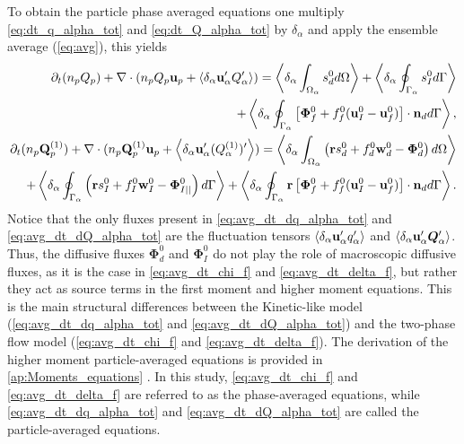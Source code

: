 To obtain the particle phase averaged equations one multiply \ref{eq:dt_q_alpha_tot} and \ref{eq:dt_Q_alpha_tot} by $\delta_\alpha$ and apply the ensemble average (\ref{eq:avg}), this yields
\begin{align}
    \partial_t (n_pQ_p)
    + \mathbf{\nabla}\cdot (n_p Q_p \textbf{u}_p + \left<\delta_\alpha \textbf{u}_\alpha' Q_\alpha'\right>)
    = \left<\delta_\alpha \int_{\Omega_{\alpha}}  s_d^0  d\Omega\right>
    + \left<\delta_\alpha \oint_{\Gamma_{\alpha}}  s_I^0  d\Gamma\right>\nonumber\\
    + \left<\delta_\alpha \oint_{\Gamma_{\alpha}}  \left[\mathbf{\Phi}_f^0 + f_f^0 (\textbf{u}_I^0-\textbf{u}_f^0) \right] \cdot \textbf{n}_d  d\Gamma\right>,
    \label{eq:avg_dt_dq_alpha_tot}\\
    \partial_t (n_p\textbf{Q}_p^{(1)})
    + \mathbf{\nabla}\cdot (n_p \textbf{Q}_p^{(1)} \textbf{u}_p + \left<\delta_\alpha \textbf{u}_\alpha' (Q_\alpha^{(1)})'\right>)
    =\left<\delta_\alpha \int_{\Omega_{\alpha}}  \left(
        \textbf{r} s_d^0         
        + f_d^0  \textbf{w}_d^0 
        - \mathbf{\Phi}_d^0
    \right)  d\Omega\right>\nonumber\\
    + \left<\delta_\alpha \oint_{\Gamma_{\alpha}}  \left(
        \textbf{r}s_I^0
        + f_I^0 \textbf{w}_I^0
        - \mathbf{\Phi}_{I||}^0
    \right)  d\Gamma\right>
    + \left<\delta_\alpha \oint_{\Gamma_{\alpha}}  \textbf{r} \left[
        \mathbf{\Phi}_f^0
        + f_f^0 (\textbf{u}_I^0-\textbf{u}_f^0)
    \right]\cdot \textbf{n}_d   d\Gamma\right>.
    \label{eq:avg_dt_dQ_alpha_tot}
\end{align}
Notice that the only fluxes present in \ref{eq:avg_dt_dq_alpha_tot} and \ref{eq:avg_dt_dQ_alpha_tot} are the fluctuation tensors $\left<\delta_\alpha \textbf{u}_\alpha' q_\alpha'\right>$ and $\left<\delta_\alpha \textbf{u}_\alpha' \bm{Q}_\alpha'\right>$. 
Thus, the diffusive fluxes $\bm\Phi_d^0$ and $\bm\Phi_I^0$ do not play the role of macroscopic diffusive fluxes, as it is the case in \ref{eq:avg_dt_chi_f} and \ref{eq:avg_dt_delta_f}, but rather they act as source terms in the first moment and higher moment equations. 
This is the main structural differences between the Kinetic-like model (\ref{eq:avg_dt_dq_alpha_tot} and \ref{eq:avg_dt_dQ_alpha_tot}) and the two-phase flow model (\ref{eq:avg_dt_chi_f} and \ref{eq:avg_dt_delta_f}). 
The derivation of the higher moment particle-averaged equations is provided in \ref{ap:Moments_equations} . 
In this study, \ref{eq:avg_dt_chi_f} and \ref{eq:avg_dt_delta_f} are referred to as the phase-averaged equations, while \ref{eq:avg_dt_dq_alpha_tot} and \ref{eq:avg_dt_dQ_alpha_tot} are called the particle-averaged equations. 

 



